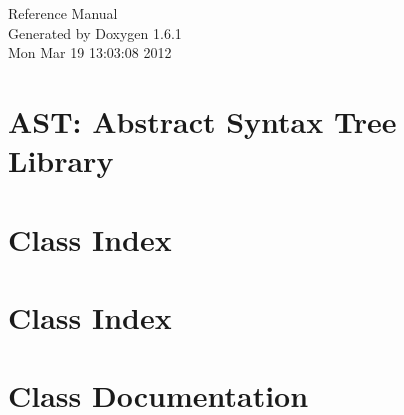 \documentclass[a4paper]{book}
\begin{document}
\hypersetup{pageanchor=false}
\begin{titlepage}
\vspace*{7cm}
\begin{center}
{\Large Reference Manual}\\
\vspace*{1cm}
{\large Generated by Doxygen 1.6.1}\\
\vspace*{0.5cm}
{\small Mon Mar 19 13:03:08 2012}\\
\end{center}
\end{titlepage}
\clearemptydoublepage
{}
\tableofcontents
\clearemptydoublepage
{}
\hypersetup{pageanchor=true}
\chapter{AST: Abstract Syntax Tree Library}
\label{index}\hypertarget{index}{}
\chapter{Class Index}

\chapter{Class Index}

\chapter{Class Documentation}


























\printindex
\end{document}

